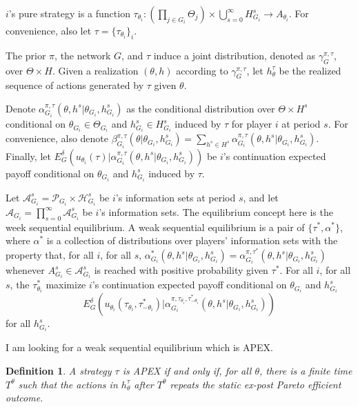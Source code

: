\documentclass[12pt,letter]{article}
\newtheorem{definition}{Definition}[section]
\theoremstyle{definition}
\theoremstyle{remark}
\theoremstyle{claim}
\begin{document}
$i$'s pure strategy is a function $\tau_{\theta_i}:(\prod_{j\in G_i}\Theta_j)\times \bigcup^{\infty}_{s=0}H^s_{G_i}\rightarrow A_{\theta_i}$. For convenience, also let $\tau=\{\tau_{\theta_i}\}_i$. 
 
The prior $\pi$, the network $G$, and $\tau$ induce a joint distribution, denoted as $\gamma^{\pi,\tau}_G$, over $\Theta\times H$. Given a realization $(\theta,h)$ according to $\gamma^{\pi,\tau}_G$, let $h^{\tau}_\theta$ be the realized sequence of actions generated by $\tau$ given $\theta$. 

Denote $\alpha^{\pi,\tau}_{G_i}(\theta, h^{s}|\theta_{G_i},h^{s}_{G_i})$ as the conditional distribution over $\Theta\times H^s$ conditional on $\theta_{G_i}\in \Theta_{G_i}$ and $h^{s}_{G_i}\in H^s_{G_i}$ induced by $\tau$ for player $i$ at period $s$. For convenience, also denote $\beta^{\pi,\tau}_{G_i}(\theta|\theta_{G_i},h^{s}_{G_i})=\sum_{h^{s}\in H^s}\alpha^{\pi,\tau}_{G_i}(\theta, h^{s}|\theta_{G_i},h^{s}_{G_i})$.
Finally, let
$E^{\delta}_G(u_{\theta_i}(\tau)|\alpha^{\pi,\tau}_{G_i}(\theta, h^{s}|\theta_{G_i},h^{s}_{G_i}))$
be $i$'s continuation expected payoff conditional on $\theta_{G_i}$ and $h^{s}_{G_i}$ induced by $\tau$. 



Let $\mathcal{A}^s_{G_i}=\mathcal{P}_{G_i}\times \mathcal{H}^s_{G_i}$ be $i$'s information sets at period $s$, and let $\mathcal{A}_{G_i}=\prod^{\infty}_{s=0}\mathcal{A}^s_{G_i}$ be $i$'s information sets. The equilibrium concept here is the week sequential equilibrium. A weak sequential equilibrium is a pair of $\{\tau^{*}, \alpha^{*}\}$, where $\alpha^{*}$ is a collection of distributions over players' information sets with the property that, for all $i$, for all $s$, $\alpha^{*}_{G_i}(\theta, h^{s}|\theta_{G_i},h^{s}_{G_i})=\alpha^{\pi,\tau^{*}}_{G_i}(\theta, h^{s}|\theta_{G_i},h^{s}_{G_i})$ whenever $A^s_{G_i}\in \mathcal{A}^{s}_{G_i}$ is reached with positive probability given $\tau^{*}$. For all $i$, for all $s$, the $\tau^{*}_{\theta_i}$ maximize $i$'s continuation expected payoff conditional on $\theta_{G_i}$ and $h^{s}_{G_i}$
\[E^{\delta}_G(u_{\theta_i}(\tau_{\theta_i},\tau^{*}_{-\theta_i})|\alpha^{\pi,\tau_{\theta_i},\tau^{*}_{-\theta_i}}_{G_i}(\theta, h^{s}|\theta_{G_i},h^{s}_{G_i}))\] for all $h^{s}_{G_i}$. 





I am looking for a weak sequential equilibrium which is APEX. 

\begin{definition}
A strategy $\tau$ is APEX  if and only if, for all $\theta$, there is a finite time $T^{\theta}$ such that the actions in $h^{\tau}_{\theta}$ after $T^{\theta}$ repeats the static ex-post Pareto efficient outcome.
\end{definition}
\end{document}
